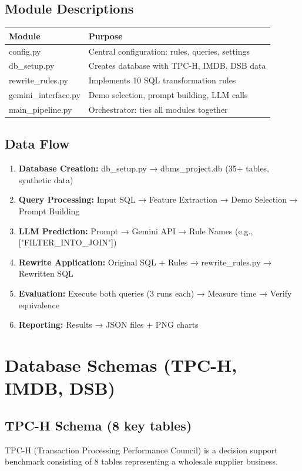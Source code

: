 \documentclass[12pt,a4paper]{article}
\begin{document}
\subsection{Module Descriptions}
\begin{table}[h]
\centering
\begin{tabular}{|l|l|}
\hline
\textbf{Module} & \textbf{Purpose} \\
\hline
config.py & Central configuration: rules, queries, settings \\
db\_setup.py & Creates database with TPC-H, IMDB, DSB data \\
rewrite\_rules.py & Implements 10 SQL transformation rules \\
gemini\_interface.py & Demo selection, prompt building, LLM calls \\
main\_pipeline.py & Orchestrator: ties all modules together \\
\hline
\end{tabular}
\end{table}

\subsection{Data Flow}
\begin{enumerate}
    \item \textbf{Database Creation:} db\_setup.py → dbms\_project.db (35+ tables, synthetic data)
    \item \textbf{Query Processing:} Input SQL → Feature Extraction → Demo Selection → Prompt Building
    \item \textbf{LLM Prediction:} Prompt → Gemini API → Rule Names (e.g., ["FILTER\_INTO\_JOIN"])
    \item \textbf{Rewrite Application:} Original SQL + Rules → rewrite\_rules.py → Rewritten SQL
    \item \textbf{Evaluation:} Execute both queries (3 runs each) → Measure time → Verify equivalence
    \item \textbf{Reporting:} Results → JSON files + PNG charts
\end{enumerate}


\section{Database Schemas (TPC-H, IMDB, DSB)}

\subsection{TPC-H Schema (8 key tables)}
TPC-H (Transaction Processing Performance Council) is a decision support benchmark consisting of 8 tables representing a wholesale supplier business.
\end{document}
